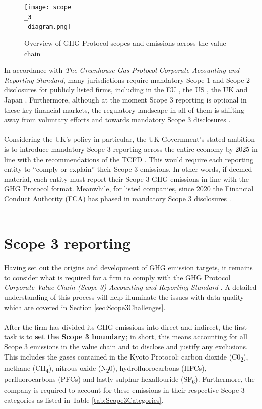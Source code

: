 \documentclass[12pt,twoside]{report}
\newcommand\fnote[1]{\captionsetup{font=scriptsize, justification=raggedright, singlelinecheck=false}\subcaption*{\textit{#1}}}
\begin{document}
\begin{figure}[H]
	\centering
	\caption{Overview of GHG Protocol scopes and emissions across the value chain}
	\label{fig:Scope3Diagram}
	\texttt{[image: scope\\\_3\\\_diagram.png]}
	\fnote{Source: \cite{ghgscope32013}, p.6}
\end{figure}

In accordance with \textit{The Greenhouse Gas Protocol Corporate Accounting and Reporting Standard}, many jurisdictions require mandatory Scope 1 and Scope 2 disclosures for publicly listed firms, including in the EU \cite{eu20232772}, the US \cite{sec2024}, the UK \cite{ukleg2018} and Japan \cite{fsa2022}. Furthermore, although at the moment Scope 3 reporting is optional in these key financial markets, the regulatory landscape in all of them is shifting away from voluntary efforts and towards mandatory Scope 3 disclosures \cite{ftserussell2024}. 
\\ \\
Considering the UK's policy in particular, the UK Government's stated ambition is to introduce mandatory Scope 3 reporting across the entire economy by 2025 in line with the recommendations of the TCFD \cite{ukgov2020}. This would require each reporting entity to ``comply or explain'' their Scope 3 emissions. In other words, if deemed material, each entity must report their Scope 3 GHG emissions in line with the GHG Protocol format. Meanwhile, for listed companies, since 2020 the Financial Conduct Authority (FCA) has phased in mandatory Scope 3 disclosures \cite{fca2020, fca2021}. 
\\ \\
\section{Scope 3 reporting}\label{sec:Scope3Reporting}
Having set out the origins and development of GHG emission targets, it remains to consider what is required for a firm to comply with the GHG Protocol \textit{Corporate Value Chain (Scope 3) Accounting and Reporting Standard} \cite{ghgscope32013}. A detailed understanding of this process will help illuminate the issues with data quality which are covered in Section \ref{sec:Scope3Challenges}.
\\ \\
After the firm has divided its GHG emissions into direct and indirect, the first task is to \textbf{set the Scope 3 boundary}; in short, this means accounting for all Scope 3 emissions in the value chain and to disclose and justify any exclusions. This includes the gases contained in the Kyoto Protocol: carbon dioxide (C0\textsubscript{2}), methane (CH\textsubscript{4}), nitrous oxide (N\textsubscript{2}0), hydrofluorocarbons (HFCs), perfluorocarbons (PFCs) and lastly sulphur hexaflouride (SF\textsubscript{6}). Furthermore, the company is required to account for these emissions in their respective Scope 3 categories as listed in Table \ref{tab:Scope3Categories}. 
\end{document}
